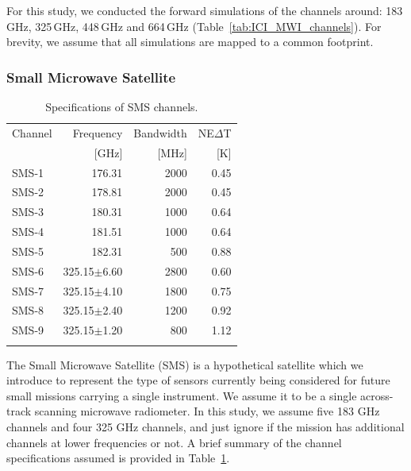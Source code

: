 \documentclass[amt, manuscript]{copernicus}
\begin{document}
For this study, we conducted the forward simulations of the channels around: 183\,GHz, 325\,GHz, 448\,GHz and 664\,GHz (Table~\ref{tab:ICI_MWI_channels}). For brevity, we assume that all simulations are mapped to a common footprint.

\subsubsection{Small Microwave Satellite}
%
\begin{table}[t]
	\caption{Specifications of SMS channels.}
	\label{tab:specifications_SMS}	
	\begin{tabular}{lrrr}
		\tophline
		Channel & Frequency 	& Bandwidth & NE$\Delta$T \\
				& [GHz]			& [MHz]		& [K]		\\
		\middlehline
		SMS-1	&	176.31    & 2000	&	0.45	\\
		SMS-2	&	178.81    & 2000 	&	0.45\\
		SMS-3	&	180.31    & 1000 	&	0.64\\
		SMS-4	&	181.51    & 1000 	&	0.64 \\
		SMS-5	&	182.31    & \phantom{0}500  &	0.88 \\
		SMS-6  & 325.15$\pm$6.60    & 2800 	 &0.60\\
		SMS-7  & 325.15$\pm$4.10    & 1800    &0.75	\\
		SMS-8  & 325.15$\pm$2.40    & 1200    &0.92\\
		SMS-9  & 325.15$\pm$1.20    & \phantom{0}800  &1.12  \\
		\bottomhline
	\end{tabular}
	\belowtable{} %
\end{table}

The Small Microwave Satellite (SMS) is a hypothetical satellite which we 
introduce to represent the type of sensors currently being considered 
for future small missions carrying a single instrument. We assume it to 
be a single across-track scanning microwave radiometer. In this study, we 
assume five 183 GHz channels and four 325 GHz channels, and just ignore 
if the mission has additional channels at lower frequencies or not. A brief summary of the  channel specifications assumed is provided in Table~\ref{tab:specifications_SMS}.
\end{document}
